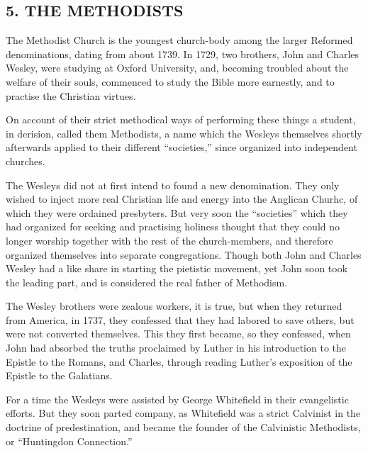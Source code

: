 \documentclass[
]{book}
\begin{document}
\subsection*{\texorpdfstring{5. THE METHODISTS}{5. THE METHODISTS}}\label{the-methodists}

The Methodist Church is the youngest church-body among the larger Reformed denominations, dating from about 1739. In 1729, two brothers, John and Charles Wesley, were studying at Oxford University, and, becoming troubled about the welfare of their souls, commenced to study the Bible more earnestly, and to practise the Christian virtues.

On account of their strict methodical ways of performing these things a student, in derision, called them Methodists, a name which the Wesleys themselves shortly afterwards applied to their different ``societies,'' since organized into independent churches.

The Wesleys did not at first intend to found a new denomination. They only wished to inject more real Christian life and energy into the Anglican Churhc, of which they were ordained presbyters. But very soon the ``societies'' which they had organized for seeking and practising holiness thought that they could no longer worship together with the rest of the church-members, and therefore organized themselves into separate congregations. Though both John and Charles Wesley had a like share in starting the pietistic movement, yet John soon took the leading part, and is considered the real father of Methodism.

The Wesley brothers were zealous workers, it is true, but when they returned from America, in 1737, they confessed that they had labored to save others, but were not converted themselves. This they first became, so they confessed, when John had absorbed the truths proclaimed by Luther in his introduction to the Epistle to the Romans, and Charles, through reading Luther's exposition of the Epistle to the Galatians.

For a time the Wesleys were assisted by George Whitefield in their evangelistic efforts. But they soon parted company, as Whitefield was a strict Calvinist in the doctrine of predestination, and became the founder of the Calvinistic Methodists, or ``Huntingdon Connection.''
\end{document}
